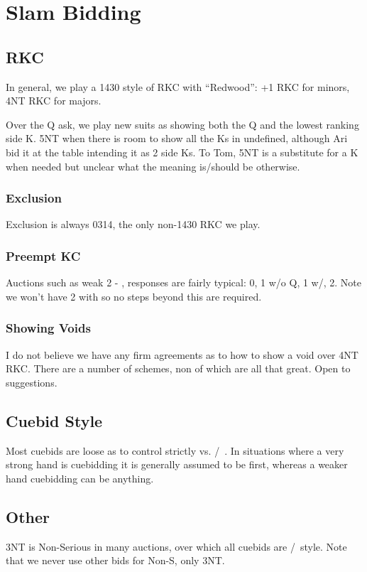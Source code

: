 \documentclass[tom-jenni]{subfile}
\begin{document}
\chapter{Slam Bidding}

\section{RKC}

In general, we play a 1430 style of RKC with ``Redwood'':  +1 RKC for minors, 4NT RKC for majors.

Over the Q ask, we play new suits as showing both the Q and the lowest ranking side K.  5NT when there is room to show all the Ks in undefined, although Ari bid it at the table intending it as 2 side Ks.  To Tom, 5NT is a substitute for a K when needed but unclear what the meaning is/should be otherwise.


\subsection{Exclusion}

Exclusion is always 0314, the only non-1430 RKC we play.

\subsection{Preempt KC}

Auctions such as weak 2 - , responses are fairly typical:  0, 1 w/o Q, 1 w/, 2.  Note we won't have 2 with so no steps beyond this are required.

\subsection{Showing Voids}

I do not believe we have any firm agreements as to how to show a void over 4NT RKC.  There are a number of schemes, non of which are all that great.  Open to suggestions.

\section{Cuebid Style}

Most cuebids are loose as to \first control strictly vs. \first/~\second.  In situations where a very strong hand is cuebidding it is generally assumed to be first, whereas a weaker hand cuebidding can be anything.

\section{Other}

3NT is Non-Serious in many auctions, over which all cuebids are \first/~\second style.  Note that we never use other bids for Non-S, only 3NT.
\end{document}
